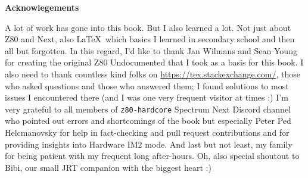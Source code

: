 \begingroup

	\textbf{Acknowlegements}

	A lot of work has gone into this book. But I also learned a lot. Not just about Z80 and Next, also \LaTeX~which basics I learned in secondary school and then all but forgotten. In this regard, I'd like to thank Jan Wilmans and Sean Young for creating the original Z80 Undocumented that I took as a basis for this book. I also need to thank countless kind folks on \url{https://tex.stackexchange.com/}, those who asked questions and those who answered them; I found solutions to most issues I encountered there (and I was one very frequent visitor at times :) I'm very grateful to all members of {\tt z80-hardcore} Spectrum Next Discord channel who pointed out errors and shortcomings of the book but especially  Peter Ped Helcmanovsky for help in fact-checking and pull request contributions and  for providing insights into Hardware IM2 mode. And last but not least, my family for being patient with my frequent long after-hours. Oh, also special shoutout to Bibi, our small JRT companion with the biggest heart :)

\endgroup
